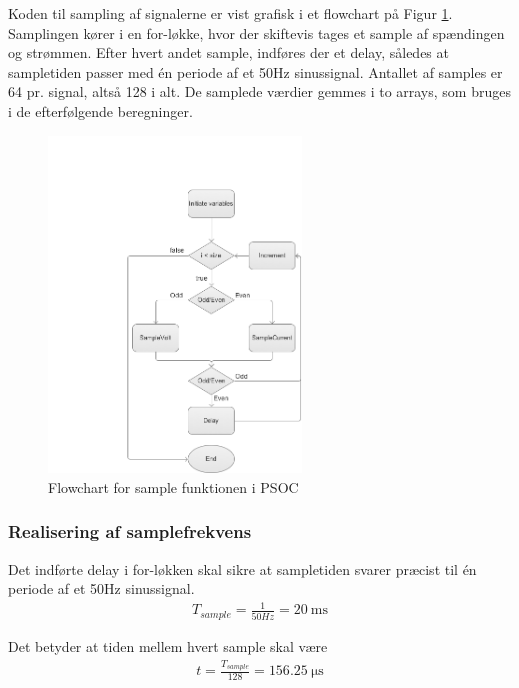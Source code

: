 Koden til sampling af signalerne er vist grafisk i et flowchart på Figur \ref{fig:MEsample}. Samplingen kører i en for-løkke, hvor der skiftevis tages et sample af spændingen og strømmen. Efter hvert andet sample, indføres der et delay, således at sampletiden passer med én periode af et 50Hz sinussignal. Antallet af samples er 64 pr. signal, altså 128 i alt. De samplede værdier gemmes i to arrays, som bruges i de efterfølgende beregninger. 


\begin{figure}[htbp] %
	\centering
	\includegraphics[width=0.6\textwidth]{Figure/MEsample}
	\caption{Flowchart for sample funktionen i PSOC}
	\label{fig:MEsample}
\end{figure}

\subsubsection{Realisering af samplefrekvens}

Det indførte delay i for-løkken skal sikre at sampletiden svarer præcist til én periode af et 50Hz sinussignal.
\begin{align}
T_{sample} = \frac{1}{50Hz} = \SI{20}{\milli\second}
\end{align}

Det betyder at tiden mellem hvert sample skal være
\begin{align}
t = \frac{T_{sample}}{128} = \SI{156,25} {\micro\second}
\end{align}

